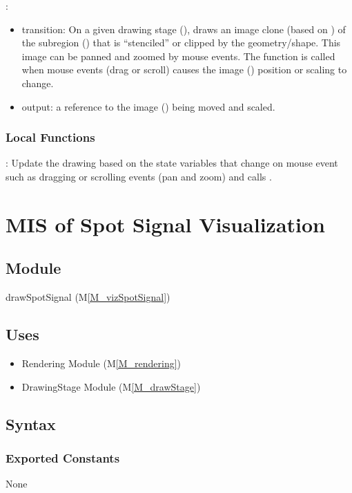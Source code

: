 \documentclass[12pt, titlepage]{article}
\newcommand{\mref}[1]{M\ref{#1}}
\newcommand{\mrefp}[1]{(\mref{#1})}
\newcommand{\mreff}[1]{Module \mrefp{#1}}
\begin{document}
\noindent {}:
\begin{itemize}
\item transition: On a given drawing stage (),
  draws an image clone (based on ) of the subregion ()
  that is ``stenciled'' or clipped by the  geometry/shape.
  This image can be panned and zoomed by mouse events.
  The  function is called when mouse events
  (drag or scroll) causes the image () position or scaling to change.
\item output: a reference to the image () being moved and scaled.
\end{itemize}

\subsubsection{Local Functions}
: Update the drawing based on the state variables that change on mouse event
  such as dragging or scrolling events (pan and zoom) and calls .

\newpage



\section{MIS of Spot Signal Visualization} \label{MS_vizSpotSignal}

\subsection{Module}
drawSpotSignal \mrefp{M_vizSpotSignal}

\subsection{Uses}
\begin{itemize}
  \item Rendering \mreff{M_rendering}
  \item DrawingStage \mreff{M_drawStage}
\end{itemize}

\subsection{Syntax}

\subsubsection{Exported Constants}
None
\end{document}
